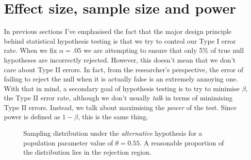 \section{Effect size, sample size and power \label{sec:effectsize}}

In previous sections I've emphasised the fact that the major design principle behind statistical hypothesis testing is that we try to control our Type I error rate. When we fix $\alpha = .05$ we are attempting to ensure that only 5\% of true null hypotheses are incorrectly rejected. However, this doesn't mean that we don't care about Type II errors. In fact, from the researcher's perspective, the error of failing to reject the null when it is actually false is an extremely annoying one. With that in mind, a secondary goal of hypothesis testing is to try to minimise $\beta$, the Type II error rate, although we don't usually {\it talk} in terms of minimising Type II errors. Instead, we talk about maximising the {\it power} of the test. Since power is defined as $1-\beta$, this is the same thing. 


\begin{figure}[htb]
\begin{center}
\caption{Sampling distribution under the {\it alternative} hypothesis for a population parameter value of $\theta = 0.55$. A reasonable proportion of the distribution lies in the rejection region.}
\HR
\label{fig:crit3}
\end{center}
\end{figure}

